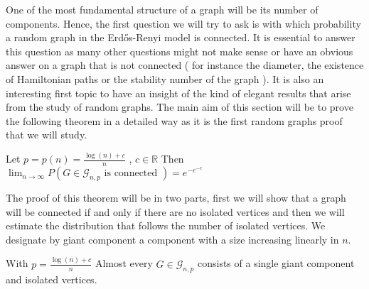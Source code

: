 One of the most fundamental structure of a graph will be its number of components. 
Hence, the first question we will try to ask is with which probability a random graph in the Erd\H{o}s-Renyi model is connected. 
It is essential to answer this question as many other questions might not make sense or have an obvious answer on a graph that is not connected ( for instance the diameter, the existence of Hamiltonian paths or the stability number of the graph ). 
\newline
It is also an interesting first topic to have an insight of the kind of elegant results that arise from the study of random graphs.
The main aim of this section will be to prove the following theorem in a detailed way as it is the first random graphs proof that we will study.
\begin{theorem}\label{th:connect}
	Let $p = p(n) = \frac{\log(n) + c}{n}$ , $c \in \mathbb{R}$
\newline
Then $\lim_{n \to \infty} P(G \in \mathcal{G}_{n, p}\text{ is connected }) = e^{-e^{-c}}$ 
\end{theorem}
The proof of this theorem will be in two parts, first we will show that a graph will be connected if and only if there are no isolated vertices and then we will estimate the distribution that follows the number of isolated vertices.
We designate by giant component a component with a size increasing linearly in $n$.
\begin{theorem}\label{th:isolcomp}
	With $p = \frac{\log(n) + c}{n}$
	 Almost every $G \in \mathcal{G}_{n, p}$ consists of a single giant component and isolated vertices. 
\end{theorem}
